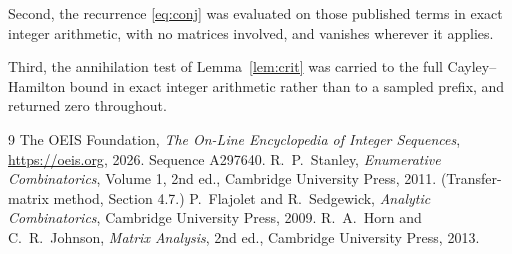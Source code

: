 \documentclass[11pt,a4paper]{article}
\theoremstyle{plain}
\theoremstyle{definition}
\begin{document}
Second, the recurrence \eqref{eq:conj} was evaluated on those published terms in exact
integer arithmetic, with no matrices involved, and vanishes wherever it applies.

Third, the annihilation test of Lemma~\ref{lem:crit} was carried to the full
Cayley--Hamilton bound in exact integer arithmetic rather than to a sampled prefix, and
returned zero throughout.

\begin{thebibliography}{9}
 The OEIS Foundation, \emph{The On-Line Encyclopedia of Integer
Sequences}, \url{https://oeis.org}, 2026. Sequence A297640.
 R.~P.~Stanley, \emph{Enumerative Combinatorics}, Volume 1, 2nd ed.,
Cambridge University Press, 2011. (Transfer-matrix method, Section 4.7.)
 P.~Flajolet and R.~Sedgewick, \emph{Analytic Combinatorics}, Cambridge
University Press, 2009.
 R.~A.~Horn and C.~R.~Johnson, \emph{Matrix Analysis}, 2nd ed., Cambridge
University Press, 2013.
\end{thebibliography}
\end{document}
